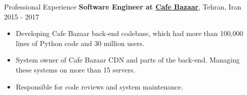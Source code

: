 \documentclass{resume} %
\begin{document}
\begin{rSection}{Professional Experience}
	{\bf Software Engineer at \href{https://cafebazaar.ir/app?l=en}{Cafe Bazaar}}, Tehran, Iran \hfill 2015 - 2017
	\smallskip
	\vspace{-0.5em}
	\begin{itemize}[leftmargin=3mm]
		\setlength{\itemsep}{1pt}
		\setlength{\parskip}{0pt}
		\setlength{\parsep}{0pt}
		\renewcommand\labelitemi{$\cdot$}

		\item Developing Cafe Bazaar back-end codebase, which had more than 100,000 lines of 
            Python code and 30 million users.
		\item System owner of Cafe Bazaar CDN and parts of the back-end. Managing these systems 
            on more than 15 servers.
		\item Responsible for code reviews and system maintenance.
	\end{itemize}
	
\end{rSection}

\end{document}
